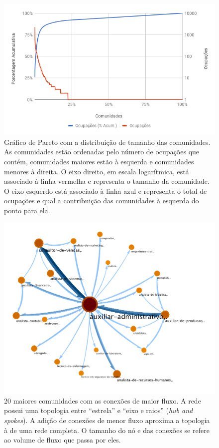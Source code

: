 \documentclass[
  article,
  11pt,
  a4paper,
  english,
  brazil,
  sumario=tradicional]{abntex2}
\begin{document}
\begin{figure}[htb]
  \centering
  \includegraphics[width=0.9\linewidth]{pareto-comunidades.png}
  \caption{Gráfico de Pareto com a distribuição de tamanho das comunidades. As comunidades estão ordenadas pelo número de ocupações que contém, comunidades maiores estão à esquerda e comunidades menores à direita. O eixo direito, em escala logarítmica, está associado à linha vermelha e representa o tamanho da comunidade. O eixo esquerdo está associado à linha azul e representa o total de ocupações e qual a contribuição das comunidades à esquerda do ponto para ela.}
  \label{fig:pareto-comunidades}
\end{figure}


\begin{figure}[ht]
  \centering
  \includegraphics[width=0.9\linewidth]{ex-sobreposicao.pdf}
  \caption{20 maiores comunidades com as conexões de maior fluxo. A rede possui uma topologia entre \enquote{estrela} e \enquote{eixo e raios} (\textit{hub and spokes}). A adição de conexões de menor fluxo aproxima a topologia à de uma rede completa.  O tamanho do nó e das conexões se refere ao volume de fluxo que passa por eles.}
  \label{fig:ex-sobreposicao}
\end{figure}
\end{document}
